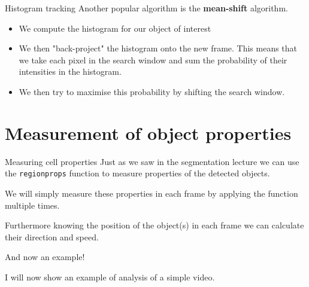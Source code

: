 \documentclass[9pt, aspectratio=169]{beamer}
\begin{document}
\begin{frame}
    {Histogram tracking}
    Another popular algorithm is the \textbf{mean-shift} algorithm.

    \begin{itemize}[<+->]
        \item We compute the histogram for our object of interest
        \item We then "back-project" the histogram onto the new frame. This means that we take each pixel in the search window and sum the probability of their intensities in the histogram.
        \item We then try to maximise this probability by shifting the search window. 
    \end{itemize}
\end{frame}
\section {Measurement of object properties}

\begin{frame}
    {Measuring cell properties}
    Just as we saw in the segmentation lecture we can use the \texttt{regionprops} function to measure properties of the detected objects.

    We will simply measure these properties in each frame by applying the function multiple times.
    
    Furthermore knowing the position of the object(s) in each frame we can calculate their direction and speed. 
\end{frame}

\begin{frame}
    {And now an example!}

    I will now show an example of analysis of a simple video.
\end{frame}
\end{document}
